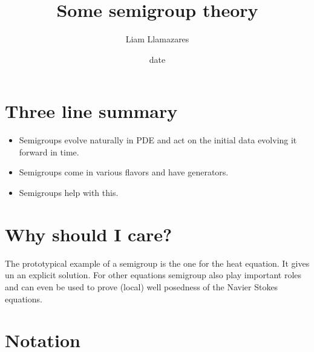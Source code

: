 \documentclass[12pt]{article}
\begin{document}
\begin{CJK*}{UTF8}{gbsn}
\title{Some semigroup theory}
\author{Liam Llamazares}
\date{date}
\maketitle
\section{ Three line summary}
\begin{itemize}
\item Semigroups evolve naturally in PDE and act on the initial data evolving it forward in time. 
\item Semigroups come in various flavors and have generators. 
\item Semigroups help with this.
\end{itemize}
\section{Why should I care?}
The prototypical example of a semigroup is the one for the heat equation. It gives un an explicit solution. For other equations semigroup also play important roles and can even be used to prove
(local) well posedness of the Navier Stokes equations.
\section{Notation}


\end{CJK*}
\end{document}
